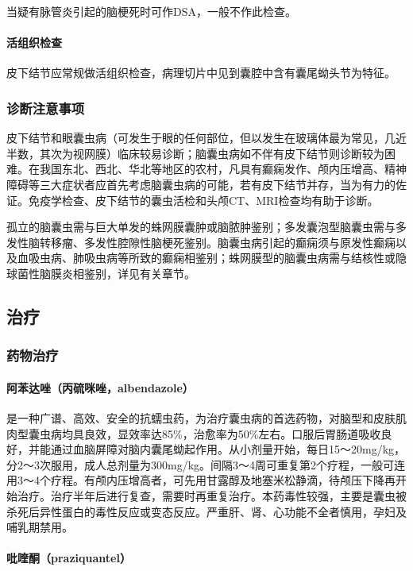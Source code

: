 当疑有脉管炎引起的脑梗死时可作DSA，一般不作此检查。

\paragraph{活组织检查}

皮下结节应常规做活组织检查，病理切片中见到囊腔中含有囊尾蚴头节为特征。

\subsubsection{诊断注意事项}

皮下结节和眼囊虫病（可发生于眼的任何部位，但以发生在玻璃体最为常见，几近半数，其次为视网膜）临床较易诊断；脑囊虫病如不伴有皮下结节则诊断较为困难。在我国东北、西北、华北等地区的农村，凡具有癫痫发作、颅内压增高、精神障碍等三大症状者应首先考虑脑囊虫病的可能，若有皮下结节并存，当为有力的佐证。免疫学检查、皮下结节的囊虫活检和头颅CT、MRI检查均有助于诊断。

孤立的脑囊虫需与巨大单发的蛛网膜囊肿或脑脓肿鉴别；多发囊泡型脑囊虫需与多发性脑转移瘤、多发性腔隙性脑梗死鉴别。脑囊虫病引起的癫痫须与原发性癫痫以及血吸虫病、肺吸虫病等所致的癫痫相鉴别；蛛网膜型的脑囊虫病需与结核性或隐球菌性脑膜炎相鉴别，详见有关章节。

\subsection{治疗}

\subsubsection{药物治疗}

\paragraph{阿苯达唑（丙硫咪唑，albendazole）}

是一种广谱、高效、安全的抗蠕虫药，为治疗囊虫病的首选药物，对脑型和皮肤肌肉型囊虫病均具良效，显效率达85\%，治愈率为50\%左右。口服后胃肠道吸收良好，并能通过血脑屏障对脑内囊尾蚴起作用。从小剂量开始，每日15～20mg/kg，分2～3次服用，成人总剂量为300mg/kg。间隔3～4周可重复第2个疗程，一般可连用3～4个疗程。有颅内压增高者，可先用甘露醇及地塞米松静滴，待颅压下降再开始治疗。治疗半年后进行复查，需要时再重复治疗。本药毒性较强，主要是囊虫被杀死后异性蛋白的毒性反应或变态反应。严重肝、肾、心功能不全者慎用，孕妇及哺乳期禁用。

\paragraph{吡喹酮（praziquantel）}

